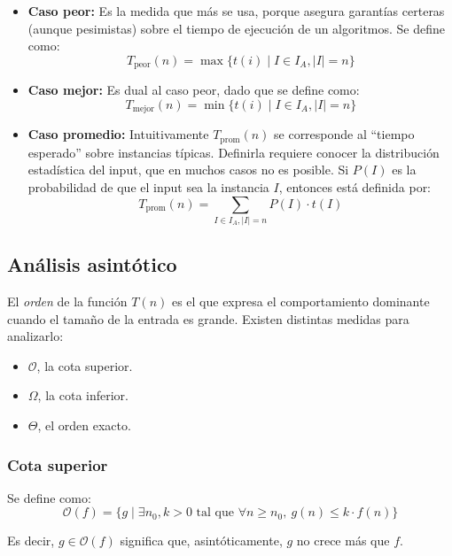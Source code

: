 \documentclass{article}
\newcommand{\BigO}[1]{{\mathcal{O}(#1)}}
\begin{document}
\begin{itemize}
    \item \textbf{Caso peor:} Es la medida que más se usa, porque asegura garantías certeras (aunque pesimistas) sobre el tiempo de ejecución de un algoritmos. Se define como:
          $$T_{\text{peor}}(n) = \max{\{t(i)} \mid I \in I_A, |I| = n\}$$
    \item \textbf{Caso mejor:} Es dual al caso peor, dado que se define como:
          $$T_{\text{mejor}}(n) = \min{\{t(i)} \mid I \in I_A, |I| = n\}$$
    \item \textbf{Caso promedio:} Intuitivamente $T_{\text{prom}}(n)$ se corresponde al ``tiempo esperado'' sobre instancias típicas. Definirla requiere conocer la distribución estadística del input, que en muchos casos no es posible. Si $P(I)$ es la probabilidad de que el input sea la instancia $I$, entonces está definida por:
          $$T_{\text{prom}}(n) = \sum_{I \in I_A, |I| = n} P(I) \cdot t(I) $$
\end{itemize}

\subsection{Análisis asintótico}

El \textit{orden} de la función $T(n)$ es el que expresa el comportamiento dominante cuando el tamaño de la entrada es grande. Existen distintas medidas para analizarlo:

\begin{itemize}
    \item $\mathcal{O}$, la cota superior.
    \item $\Omega$, la cota inferior.
    \item $\Theta$, el orden exacto.
\end{itemize}

\subsubsection{Cota superior}

Se define como:
$$\BigO{f} = \{ g \mid \exists n_0, k > 0 \text{ tal que } \forall n \geq n_0,\ g(n) \leq k \cdot f(n) \}$$

Es decir, $g \in \BigO{f}$ significa que, asintóticamente, $g$ no crece más que $f$.
\end{document}
